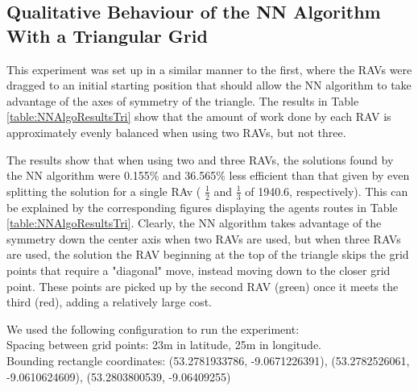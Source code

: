 \pagebreak
\subsection{Qualitative Behaviour of the NN Algorithm With a Triangular Grid}
This experiment was set up in a similar manner to the first, where the RAVs were dragged to an initial starting position that should allow the NN algorithm to take advantage of the axes of symmetry of the triangle.
The results in Table \ref{table:NNAlgoResultsTri} show that the amount of work done by each RAV is approximately evenly balanced when using two RAVs, but not three. 

The results show that when using two and three RAVs, the solutions found by the NN algorithm were 0.155\% and 36.565\% less efficient than that given by even splitting the solution for a single RAv ( $\frac{1}{2}$ and $\frac{1}{3}$ of 1940.6, respectively). This can be explained by the corresponding figures displaying the agents routes in Table \ref{table:NNAlgoResultsTri}. Clearly, the NN algorithm takes advantage of the symmetry down the center axis when two RAVs are used, but when three RAVs are used, the solution the RAV beginning at the top of the triangle skips the grid points that require a "diagonal" move, instead moving down to the closer grid point. These points are picked up by the second RAV (green) once it meets the third (red), adding a relatively large cost.

We used the following configuration to run the experiment:
\\Spacing between grid points: 23m in latitude, 25m in longitude.
\\Bounding rectangle coordinates: (53.2781933786, -9.0671226391), (53.2782526061, -9.0610624609), (53.2803800539, -9.06409255)
\\

